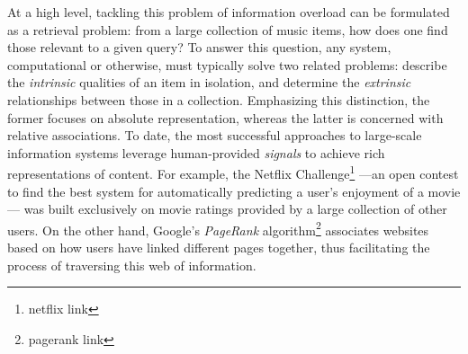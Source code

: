 At a high level, tackling this problem of information overload can be formulated as a retrieval problem: from a large collection of music items, how does one find those relevant to a given query?
To answer this question, any system, computational or otherwise, must typically solve two related problems: describe the \emph{intrinsic} qualities of an item in isolation, and determine the \emph{extrinsic} relationships between those in a collection.
Emphasizing this distinction, the former focuses on absolute representation, whereas the latter is concerned with relative associations.
To date, the most successful approaches to large-scale information systems leverage human-provided \emph{signals} to achieve rich representations of content.
For example, the Netflix Challenge\footnote{netflix link} ---an open contest to find the best system for automatically predicting a user's enjoyment of a movie--- was built exclusively on movie ratings provided by a large collection of other users.
On the other hand, Google's \emph{PageRank} algorithm\footnote{pagerank link} associates websites based on how users have linked different pages together, thus facilitating the process of traversing this web of information.

